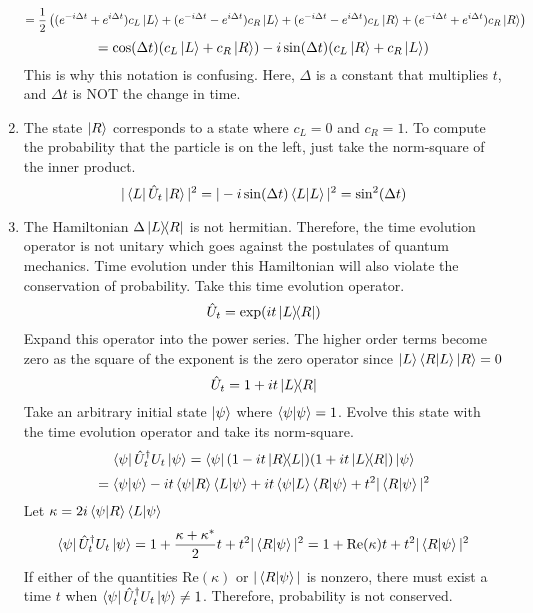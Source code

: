 \begin{sol}
\begin{enumerate}[label=\textbf{(\alph*)}]
\begin{equation}
\end{equation}
\begin{equation}
	=\frac{1}{2}\left((e^{-i\Delta t}+e^{i\Delta t})c_L\ket L+(e^{-i\Delta t}-e^{i\Delta t})c_R\ket L+(e^{-i\Delta t}-e^{i\Delta t})c_L\ket R+(e^{-i\Delta t}+e^{i\Delta t})c_R\ket R\right)
\end{equation}
\begin{equation}
	=\cos(\Delta t)(c_L\ket L+c_R\ket R)-i\sin(\Delta t)(c_L\ket R+c_R\ket L)
\end{equation} 
This is why this notation is confusing. Here, $\Delta$ is a constant that multiplies $t$, and $\Delta t$ is NOT the change in time. 
\item
The state $\ket R$ corresponds to a state where $c_L=0$ and $c_R=1$. To compute the probability that the particle is on the left, just take the norm-square of the inner product.
\begin{equation}
	|\bra L\hat U_t\ket R|^2=|-i\sin(\Delta t)\braket{L}{L}|^2=\sin^2(\Delta t)
\end{equation} 
\item
The Hamiltonian $\Delta\ketbra{L}{R}$ is not hermitian. Therefore, the time evolution operator is not unitary which goes against the postulates of quantum mechanics. Time evolution under this Hamiltonian will also violate the conservation of probability. Take this time evolution operator.
\begin{equation}
	\hat U_t=\exp(it\ketbra{L}{R})
\end{equation} 
Expand this operator into the power series. The higher order terms become zero as the square of the exponent is the zero operator since $\ket L\braket{R}{L}\ket R=0$
\begin{equation}
	\hat U_t=1+it\ketbra{L}{R}
\end{equation}
Take an arbitrary initial state $\ket\psi$ where $\braket{\psi}{\psi}=1$. Evolve this state with the time evolution operator and take its norm-square.
\begin{equation}
	\bra\psi\hat U_t^\dagger U_t\ket\psi=\bra\psi(1-it\ketbra{R}{L})(1+it\ketbra{L}{R})\ket\psi
\end{equation}
\begin{equation}
	=\braket{\psi}{\psi}-it\braket{\psi}{R}\braket{L}{\psi}+it\braket{\psi}{L}\braket{R}{\psi}+t^2|\braket{R}{\psi}|^2
\end{equation}
Let $\kappa=2i\braket{\psi}{R}\braket{L}{\psi}$
\begin{equation}
	\bra\psi\hat U_t^\dagger U_t\ket\psi=1+\frac{\kappa+\kappa^*}{2}t+t^2|\braket{R}{\psi}|^2=1+\text{Re}(\kappa)t+t^2|\braket{R}{\psi}|^2
\end{equation}
If either of the quantities $\text{Re}(\kappa)$ or $|\braket{R}{\psi}|$ is nonzero, there must exist a time $t$ when $\bra\psi\hat U_t^\dagger U_t\ket\psi\neq 1$. Therefore, probability is not conserved. 
\end{enumerate}
\end{sol}